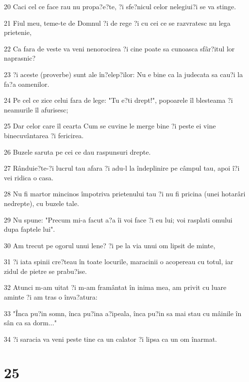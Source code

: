\par 20 Caci cel ce face rau nu propa?e?te, ?i sfe?nicul celor nelegiui?i se va stinge.
\par 21 Fiul meu, teme-te de Domnul ?i de rege ?i cu cei ce se razvratesc nu lega prietenie,
\par 22 Ca fara de veste va veni nenorocirea ?i cine poate sa cunoasca sfâr?itul lor naprasnic?
\par 23 ?i aceste (proverbe) sunt ale în?elep?ilor: Nu e bine ca la judecata sa cau?i la fa?a oamenilor.
\par 24 Pe cel ce zice celui fara de lege: "Tu e?ti drept!", popoarele îl blesteama ?i neamurile îl afurisesc;
\par 25 Dar celor care îl cearta Cum se cuvine le merge bine ?i peste ei vine binecuvântarea ?i fericirea.
\par 26 Buzele saruta pe cei ce dau raspunsuri drepte.
\par 27 Rânduie?te-?i lucrul tau afara ?i adu-l la îndeplinire pe câmpul tau, apoi î?i vei ridica o casa.
\par 28 Nu fi martor mincinos împotriva prietenului tau ?i nu fi pricina (unei hotarâri nedrepte), cu buzele tale.
\par 29 Nu spune: "Precum mi-a facut a?a îi voi face ?i eu lui; voi rasplati omului dupa faptele lui".
\par 30 Am trecut pe ogorul unui lene? ?i pe la via unui om lipsit de minte,
\par 31 ?i iata spinii cre?teau în toate locurile, maracinii o acopereau cu totul, iar zidul de pietre se prabu?ise.
\par 32 Atunci m-am uitat ?i m-am framântat în inima mea, am privit cu luare aminte ?i am tras o înva?atura:
\par 33 "Înca pu?in somn, înca pu?ina a?ipeala, înca pu?in sa mai stau cu mâinile în sân ca sa dorm..."
\par 34 ?i saracia va veni peste tine ca un calator ?i lipsa ca un om înarmat.

\chapter{25}

